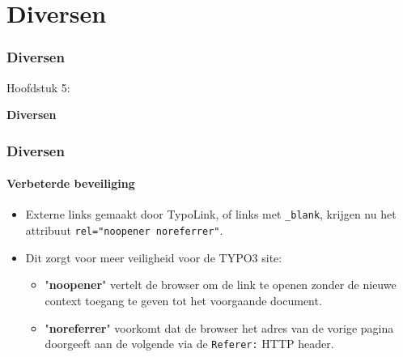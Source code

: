 %

\section{Diversen}
\begin{frame}[fragile]
	\frametitle{Diversen}

	\begin{center}\huge{Hoofdstuk 5:}\end{center}
	\begin{center}\huge{\color{typo3darkgrey}\textbf{Diversen}}\end{center}

\end{frame}


\begin{frame}[fragile]
	\frametitle{Diversen}
	\framesubtitle{Verbeterde beveiliging}

	\begin{itemize}
		\item Externe links gemaakt door TypoLink, of links met \texttt{\_blank},
			krijgen nu het attribuut \texttt{rel="noopener noreferrer"}.
		\item Dit zorgt voor meer veiligheid voor de TYPO3 site:

			\begin{itemize}
				\item "\textbf{noopener}" vertelt de browser om de link te openen zonder
					de nieuwe context toegang te geven tot het voorgaande document.
				\item "\textbf{noreferrer}" voorkomt dat de browser het adres van de vorige pagina
					doorgeeft aan de volgende via de
					\texttt{Referer:} HTTP header.
			\end{itemize}

	\end{itemize}

\end{frame}


